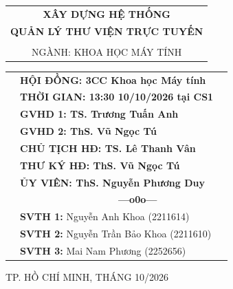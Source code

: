 \documentclass[a4paper]{article}
\theoremstyle{definition}
\begin{document}
\begin{titlepage}
\begin{center}
\begin{tabular}{c}
			\textbf{\LARGE XÂY DỰNG HỆ THỐNG }    \\
			\textbf{\LARGE QUẢN LÝ THƯ VIỆN TRỰC TUYẾN}
			\\
			\\ \vspace{0.5cm} {\Large NGÀNH: KHOA HỌC MÁY TÍNH}
		\end{tabular}
	\end{center}
	\vspace{0.5cm}
	\begin{table}[h]
		\begin{tabular}{rll}
			\hspace{2.5 cm} & \textbf{\Large HỘI ĐỒNG: 3CC Khoa học Máy tính}
			\\[0.2cm]
			\hspace{2.5 cm} & \textbf{\Large THỜI GIAN: 13:30 10/10/2026 tại CS1}
			\\[0.2cm]
			\hspace{2.5 cm} & \textbf{\Large GVHD 1: TS. Trương Tuấn Anh}
			\\[0.2cm]
			\hspace{2.5 cm} & \textbf{\Large GVHD 2: ThS. Vũ Ngọc Tú}
			\\[0.2cm]
			\hspace{2.5 cm} & \textbf{\Large CHỦ TỊCH HĐ: TS. Lê Thanh Vân}
			\\[0.2cm]
			\hspace{2.5 cm} & \textbf{\Large THƯ KÝ HĐ: ThS. Vũ Ngọc Tú}
			\\[0.2cm]
			\hspace{2.5 cm} & \textbf{\Large ỦY VIÊN: ThS. Nguyễn Phương Duy}
			\\[0.2cm]
			\hspace{4 cm} & \textbf{$\;$ $\;$$\;$$\;$$\;$$\;$$\;$$\;$$\;$$\;$$\;$$\;$$\;$$\;$$\;$$\;$$\;$$\;$$\;$$\;$$\;$$\;$$\;$$\;$$\;$$\;$$\;$$\;$$\;$$\;$$\;$$\;$$\;$$\;$ \Large ---o0o---}
			\\[0.2cm]
			\hspace{4 cm} & \textbf{\Large SVTH 1:} {\Large Nguyễn Anh Khoa (2211614)}
			\\[0.2cm]
			\hspace{4 cm} & \textbf{\Large SVTH 2:}  {\Large Nguyễn Trần Bảo Khoa (2211610)}
			\\[0.2cm]
			\hspace{4 cm} & \textbf{\Large SVTH 3:}  {\Large Mai Nam Phương (2252656)}
			\\[0.2cm]
		\end{tabular}
	\end{table}
	\vspace{0.5cm}
	\begin{center}
		{\Large TP. HỒ CHÍ MINH, THÁNG 10/2026 }
	\end{center}
\end{titlepage}
\newpage



\newpage
\tableofcontents
\newpage
\listoffigures
\newpage
\listoftables
\newpage
\setcounter{page}{1}
\end{document}
